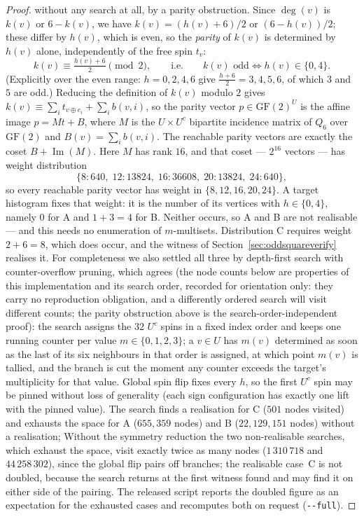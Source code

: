 \documentclass[12pt,a4paper]{article}
\theoremstyle{definition}
\begin{document}
\begin{proof}
without any search at all, by a parity obstruction. Since $\deg(v)$ is
$k(v)$ or $6-k(v)$, we have $k(v)=(h(v)+6)/2$ or $(6-h(v))/2$; these differ by
$h(v)$, which is even, so the \emph{parity} of $k(v)$ is determined by $h(v)$
alone, independently of the free spin $t_v$:
\[
k(v)\equiv\tfrac{h(v)+6}{2}\pmod 2,
\qquad\text{i.e.}\qquad
k(v)\text{ odd}\iff h(v)\in\{0,4\}.
\]
(Explicitly over the even range: $h=0,2,4,6$ give
$\tfrac{h+6}{2}=3,4,5,6$, of which $3$ and $5$ are odd.)
Reducing the definition of $k(v)$ modulo $2$ gives
$k(v)\equiv\sum_i t_{v\oplus e_i}+\sum_i b(v,i)$, so the parity vector
$p\in\mathrm{GF}(2)^{U}$ is the affine image $p=Mt+B$, where $M$ is the
$U\times U^{c}$ bipartite incidence matrix of $Q_6$ over $\mathrm{GF}(2)$ and
$B(v)=\sum_i b(v,i)$. The reachable parity vectors are exactly the coset
$B+\operatorname{Im}(M)$. Here $M$ has rank $16$, and that coset --- $2^{16}$
vectors --- has weight distribution
\[
\{8{:}640,\;12{:}13824,\;16{:}36608,\;20{:}13824,\;24{:}640\},
\]
so every reachable parity vector has weight in $\{8,12,16,20,24\}$. A target
histogram fixes that weight: it is the number of its vertices with
$h\in\{0,4\}$, namely $0$ for A and $1+3=4$ for B. Neither occurs, so A and B
are not realisable --- and this needs no enumeration of $m$-multisets.
Distribution C requires weight $2+6=8$, which does occur, and the witness of
Section~\ref{sec:oddsquareverify} realises it.
For completeness we also settled all three by
depth-first search with counter-overflow pruning, which agrees (the node
counts below are properties of this implementation and its search order,
recorded for orientation only: they carry no reproduction obligation, and a
differently ordered search will visit different counts; the parity
obstruction above is the search-order-independent proof): the search assigns
the $32$ $U^{c}$ spins in a fixed index order and keeps one running counter
per value $m\in\{0,1,2,3\}$; a $v\in U$ has $m(v)$ determined as soon as the
last of its six neighbours in that order is assigned, at which point $m(v)$
is tallied, and the branch is cut the moment any counter exceeds the
target's multiplicity for that value. Global spin
flip fixes every $h$, so the first $U^{c}$ spin may be pinned without
loss of generality (each sign configuration has exactly one lift with the
pinned value). The search finds a
realisation for C ($501$ nodes visited) and exhausts the space for A
($655{,}359$ nodes) and B ($22{,}129{,}151$ nodes) without a realisation;
Without the symmetry reduction the two non-realisable searches, which exhaust
the space, visit exactly twice as many nodes ($1\,310\,718$ and $44\,258\,302$),
since the global flip pairs off branches; the realisable case~C is not doubled,
because the search returns at the first witness found and may find it on either
side of the pairing. The released script reports the doubled figure as an
expectation for the exhausted cases and recomputes both on request
(\texttt{-{}-full}).
\end{proof}
\end{document}
